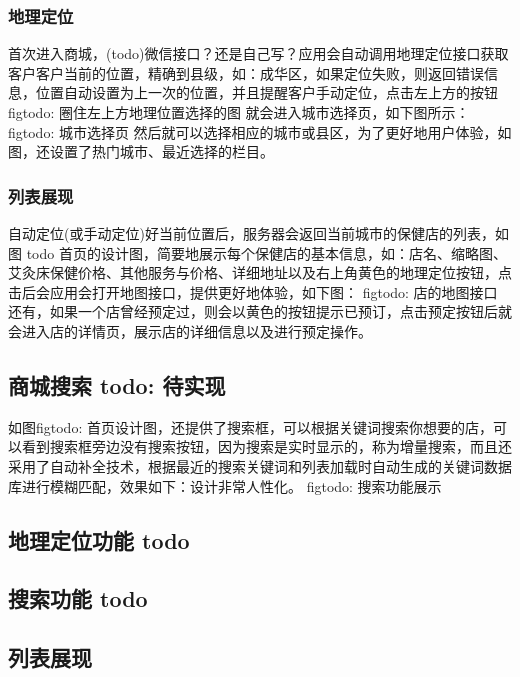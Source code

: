 \documentclass[UTF8]{ctexbook}
\begin{document}
      \subsubsection{地理定位}
        \label{subsubsec:地理定位功能}
        首次进入商城，(todo)微信接口？还是自己写？应用会自动调用地理定位接口获取客户客户当前的位置，精确到县级，如：成华区，如果定位失败，则返回错误信息，位置自动设置为上一次的位置，并且提醒客户手动定位，点击左上方的按钮
        figtodo: 圈住左上方地理位置选择的图
        就会进入城市选择页，如下图所示：
        figtodo: 城市选择页
        然后就可以选择相应的城市或县区，为了更好地用户体验，如图，还设置了热门城市、最近选择的栏目。

      \subsubsection{列表展现}
        \label{subsubsec:列表展现}
        自动定位(或手动定位)好当前位置后，服务器会返回当前城市的保健店的列表，如图 todo 首页的设计图，简要地展示每个保健店的基本信息，如：店名、缩略图、艾灸床保健价格、其他服务与价格、详细地址以及右上角黄色的地理定位按钮，点击后会应用会打开地图接口，提供更好地体验，如下图：
        figtodo: 店的地图接口
        还有，如果一个店曾经预定过，则会以黄色的按钮提示已预订，点击预定按钮后就会进入店的详情页，展示店的详细信息以及进行预定操作。

      \subsection{商城搜索 todo: 待实现}
        \label{subsec:商城搜索_todo_待实现}
        如图figtodo: 首页设计图，还提供了搜索框，可以根据关键词搜索你想要的店，可以看到搜索框旁边没有搜索按钮，因为搜索是实时显示的，称为增量搜索，而且还采用了自动补全技术，根据最近的搜索关键词和列表加载时自动生成的关键词数据库进行模糊匹配，效果如下：设计非常人性化。
        figtodo: 搜索功能展示

    \subsection{地理定位功能 todo}
      \label{subsec:地理定位功能_todo}

    \subsection{搜索功能 todo}
      \label{subsec:搜索功能_todo}

    \subsection{列表展现}
      \label{subsec:列表展现}
\end{document}
